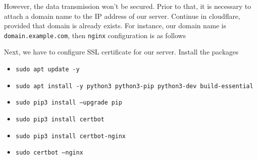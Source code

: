 However, the data transmission won't be secured.
Prior to that, it is necessary to attach a domain name to the IP address of our server.
Continue in cloudflare, provided that domain is already exists.
For instance, our domain name is \texttt{domain.example.com}, then \texttt{nginx}
configuration is as follows
\begin{center}
\end{center}
Next, we have to configure SSL certificate for our server.
Install the packages
\begin{itemize}
    \item \texttt{sudo apt update -y}
    \item \texttt{sudo apt install -y python3 python3-pip python3-dev build-essential}
    \item \texttt{sudo pip3 install --upgrade pip}
    \item \texttt{sudo pip3 install certbot}
    \item \texttt{sudo pip3 install certbot-nginx}
    \item \texttt{sudo certbot --nginx}
\end{itemize}
